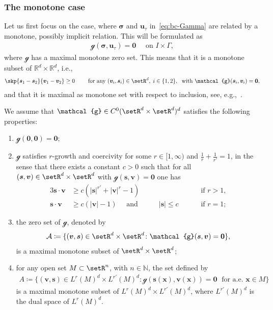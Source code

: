 \documentclass[reqno,a4paper]{amsart}
\def\abs#1{\left| #1 \right|}
\def\vec#1{\boldsymbol{#1}}
\def\b0{\vec{0}}
\def\bs{\vec{s}}
\def\bu{\vec{u}}
\def\bv{\vec{v}}
\def\bx{\vec{x}}
\def\bsigma{\vec{\sigma}}
\def\gbd{\vec{\mathcal{g}}}
\begin{document}
	\subsubsection*{The monotone case}
	Let us first focus on the case, where $\bsigma$ and $\bu_{\tau}$ in~\eqref{eq:bc-Gamma} are related by a monotone, possibly implicit relation. 
	This will be formulated as
	\begin{align}\label{eq:gbd}
		\gbd(\bsigma, \bu_\tau) = \b0 \quad \text{ on } I\times\Gamma,
	\end{align}
	where $\gbd$  has a maximal monotone zero set. 
	This means that it is a monotone subset of $\mathbb{R}^d\times \mathbb{R}^d$, i.e., 
	\begin{align*}
		\skp{\bs_1- \bs_2}{\bv_1 - \bv_2} \geq 0 \qquad \text{ for any } (\bv_i, \bs_i)\in \setR^d, \; i \in \{1,2\}, \;\text{ with } \gbd(\bs_i,\bv_i) = \b0, 
	\end{align*}
	and that it is maximal as monotone set with respect to inclusion, see, e.g.,~\cite[Sec.~1]{Phelps1997}.
	
	\begin{assumption}\label{assump:gbd-mon}
		We assume that $\gbd \in C^{0}(\setR^d \times \setR^d)^d$ satisfies the following properties:
		\begin{enumerate}[label = (A\arabic*)]
			\item \label{itm:gbd-0} $\gbd(\b0,\b0) = \b0$; 
			\item \label{itm:gbd-q} $\gbd$ satisfies $r$-growth and coercivity for some $r\in [1,\infty)$ and $\frac{1}{r} + \frac{1}{r'} = 1$, in the sense that there exists a constant $c>0$ such that for all $(\bs, \bv) \in \setR^d \times \setR^d$ with $\gbd(\bs,\bv) = \b0$ one has  
			\begin{alignat*}{3}
				\bs \cdot \bv &\geq c (\abs{\bs}^{r'} + \abs{\bv}^r - 1)&& \qquad \qquad &\text{ if } r >1, \\
				\bs \cdot \bv &\geq c ( \abs{\bv} - 1) \quad   \text{ and }\quad & &\abs{\bs} \leq c \qquad 
				&\text{ if } r = 1; 
			\end{alignat*} 
			\item \label{itm:gbd-mon} 
			the zero set of $\gbd$, denoted by
			\begin{align*}
				\mathcal{A} \coloneqq \{(\bv,\bs) \in \setR^d \times \setR^d \colon \gbd(\bs,\bv) = \b0\}, 
			\end{align*}
			is a maximal monotone subset of $\setR^d \times \setR^d$; 
			\item \label{itm:gbd-mon-lp}	
			for any open set $M \subset \setR^n$, with $n \in \mathbb{N}$, the set defined by 
			\begin{align}\label{def:A}
				{A} \coloneqq \{(\bv,\bs) \in L^{r}(M)^d\times L^{r'}(M)^d \colon \gbd(\bs(\bx),\bv(\bx)) = \b0 \;\text{ for a.e. } \bx\in M\}
			\end{align}
			is a maximal monotone subset of $L^{r}(M)^d\times L^{r'}(M)^d$, where $L^{r'}(M)^d$  is the dual space of $L^{r}(M)^d$. 
		\end{enumerate}
	\end{assumption}
	
\end{document}
